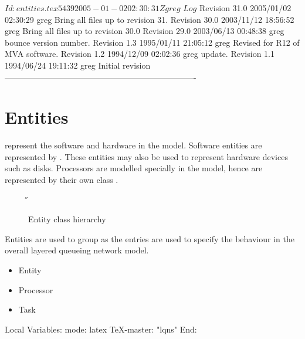 \C 
\C $Id: entities.tex 5439 2005-01-02 02:30:31Z greg $
\C 
\C $Log$
\C Revision 31.0  2005/01/02 02:30:29  greg
\C Bring all files up to revision 31.
\C
\C Revision 30.0  2003/11/12 18:56:52  greg
\C Bring all files up to revision 30.0
\C
\C Revision 29.0  2003/06/13 00:48:38  greg
\C bounce version number.
\C
\C Revision 1.3  1995/01/11 21:05:12  greg
\C Revised for R12 of MVA software.
\C
\C Revision 1.2  1994/12/09  02:02:36  greg
\C update.
\C
\C Revision 1.1  1994/06/24  19:11:32  greg
\C Initial revision
\C
\C ----------------------------------------------------------------------
\chapter{Entities}
\label{sec:entities}

 represent the software and hardware  in the
model.  Software entities are represented by
.  These entities may also be used to
represent hardware devices such as disks.  Processors are modelled
specially in the model, hence are represented by their own class
.

\begin{figure}[htbp]
  \label{fig:entity}
  \begin{center}
    \T \tex \leavevmode 
    \caption{Entity class hierarchy}
    \H {}
  \end{center}
\end{figure}

Entities are used to group  as the
entries are used to specify the behaviour in the overall layered
queueing network model.

\begin{iftex}
\begin{itemize}
\item Entity
\item Processor
\item Task
\end{itemize}
\end{iftex}




\C Local Variables: 
\C mode: latex
\C TeX-master: "lqns"
\C End: 
